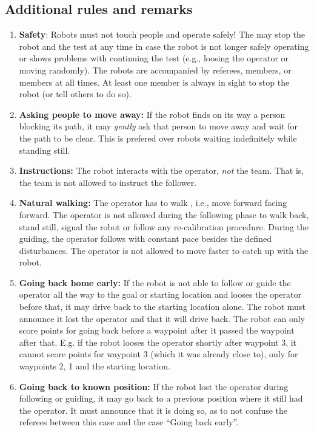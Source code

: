 \subsection{Additional rules and remarks}
\begin{enumerate}
\item \textbf{Safety}: Robots must not touch people and operate safely! 
  The \TC may stop the robot and the test at any time in case the robot is not longer safely operating or shows problems with continuing the test (e.g., loosing the operator or moving randomly).
  The robots are accompanied by referees, \OC members, or \TC members at all times.
  At least one \TC member is always in sight to stop the robot (or tell others to do so).
\item \textbf{Asking people to move away:} If the robot finds on its way a person blocking its path, it may \textit{gently} ask that person to move away and wait for the path to be clear. 
  This is prefered over robots waiting indefinitely while standing still. 
\item \textbf{Instructions:} The robot interacts with the operator, \emph{not} the team. 
  That is, the team is not allowed to instruct the follower.
\item \textbf{Natural walking:} The operator has to walk , i.e., move forward facing forward. 
  The operator is not allowed during the following phase to walk back, stand still, signal the robot or follow any re-calibration procedure.
  During the guiding, the operator follows with constant pace besides the defined disturbances. 
  The operator is not allowed to move faster to catch up with the robot. 
\item \textbf{Going back home early: } If the robot is not able to follow or guide the operator all the way to the goal or starting location and looses the operator before that, it may drive back to the starting location alone.
  The robot must announce it lost the operator and that it will drive back. 
  The robot can only score points for going back before a waypoint after it passed the waypoint after that. 
  E.g. if the robot looses the operator shortly after waypoint 3, it cannot score points for waypoint 3 (which it was already close to), only for waypoints 2, 1 and the starting location.
\item \textbf{Going back to known position: } If the robot lost the operator during following or guiding, it may go back to a previous position where it still had the operator. 
  It must announce that it is doing so, as to not confuse the referees between this case and the case ``Going back early''. 
\end{enumerate}


